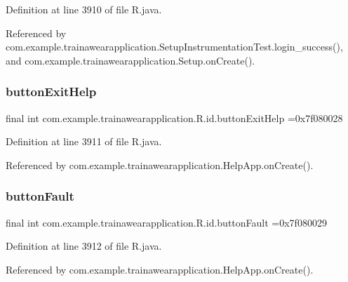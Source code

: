 Definition at line 3910 of file R.\+java.



Referenced by com.\+example.\+trainawearapplication.\+Setup\+Instrumentation\+Test.\+login\+\_\+success(), and com.\+example.\+trainawearapplication.\+Setup.\+on\+Create().

\mbox{\label{classcom_1_1example_1_1trainawearapplication_1_1_r_1_1id_a31edb6c04f8d4e212e97edfc50093f3c}} 
\subsubsection{\texorpdfstring{buttonExitHelp}{buttonExitHelp}}
{\footnotesize\ttfamily final int com.\+example.\+trainawearapplication.\+R.\+id.\+button\+Exit\+Help =0x7f080028\hspace{0.3cm}{\ttfamily [static]}}



Definition at line 3911 of file R.\+java.



Referenced by com.\+example.\+trainawearapplication.\+Help\+App.\+on\+Create().

\mbox{\label{classcom_1_1example_1_1trainawearapplication_1_1_r_1_1id_aa8ba71986b6d76f36594480f4813f131}} 
\subsubsection{\texorpdfstring{buttonFault}{buttonFault}}
{\footnotesize\ttfamily final int com.\+example.\+trainawearapplication.\+R.\+id.\+button\+Fault =0x7f080029\hspace{0.3cm}{\ttfamily [static]}}



Definition at line 3912 of file R.\+java.



Referenced by com.\+example.\+trainawearapplication.\+Help\+App.\+on\+Create().


